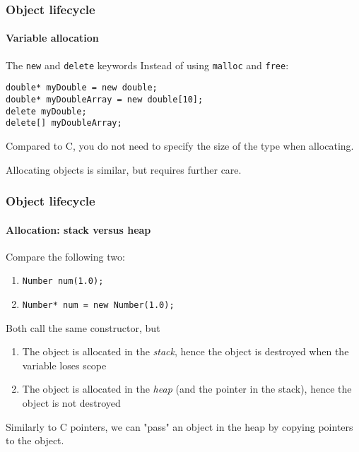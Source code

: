 \begin{frame}[fragile]
\frametitle{Object lifecycle}
\framesubtitle{Variable allocation}

\begin{block}{The \texttt{new} and \texttt{delete} keywords}
Instead of using \texttt{malloc} and \texttt{free}:

\begin{verbatim}
double* myDouble = new double;
double* myDoubleArray = new double[10];
delete myDouble;
delete[] myDoubleArray;
\end{verbatim}
Compared to C, you do not need to specify the size of the type when allocating.

Allocating objects is similar, but requires further care.
\end{block}

\end{frame}

\begin{frame}
\frametitle{Object lifecycle}
\framesubtitle{Allocation: stack versus heap}

\begin{block}{Compare the following two:}
\begin{enumerate}
\item \texttt{Number num(1.0); }
\item \texttt{Number* num = new Number(1.0); }
\end{enumerate}
Both call the same constructor, but
\begin{enumerate}
\item The object is allocated in the {\em stack}, hence the object is destroyed when the variable loses scope
\item The object is allocated in the {\em heap} (and the pointer in the stack), hence the object is not destroyed
\end{enumerate}
Similarly to C pointers, we can "pass" an object in the heap by copying pointers to the object.
\end{block}

\end{frame}

